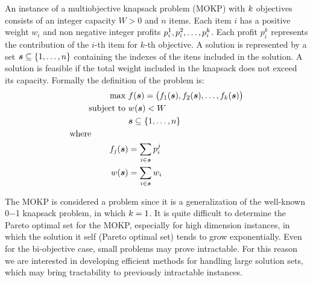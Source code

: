 An instance of a multiobjective knapsack problem (MOKP) with $k$
objectives consists of an integer capacity $W > 0$ and $n$ items.
Each item $i$ has a positive weight $w_i$ and non negative integer
profits $p_i^1, p_i^2, \ldots, p_{i}^{k}$.
Each profit $p_i^k$ represents the contribution of the $i$-th item for $k$-th objective.
A solution is represented by a set $\boldsymbol{s} \subseteq \{1, \ldots, n\}$
containing the indexes of the itens included in the solution.
A solution is feasible if the total weight included in the knapsack does
not exceed its capacity.
Formally the definition of the problem is:
\begin{align*}
    \text{max   } & f(\boldsymbol{s}) = 
      \big(f_1(\boldsymbol{s}) ,f_2(\boldsymbol{s}) ,\ldots ,f_{k}(\boldsymbol{s})\big) \\
    \text{subject to   } & w(\boldsymbol{s}) < W \\
    & \boldsymbol{s} \subseteq \{1, \ldots, n\}\\
    \text{where} \phantom{mmmmm} \\
    f_j(\boldsymbol{s}) &= \sum_{i \in \boldsymbol{s}} p^j_i\\
    w(\boldsymbol{s}) &= \sum_{i \in \boldsymbol{s}} w_i
\end{align*}

The MOKP is considered a \nphard{} problem since it is a generalization
of the well-known 0$-$1 knapsack problem, in which $k = 1$.
It is quite difficult to determine the Pareto optimal set for the MOKP,
especially for high dimension instances, in which the solution it self
(Pareto optimal set) tends to grow exponentially.
Even for the bi-objective case, small problems may prove intractable.
For this reason we are interested in developing efficient methods for
handling large solution sets, which may bring tractability to previously
intractable instances.

